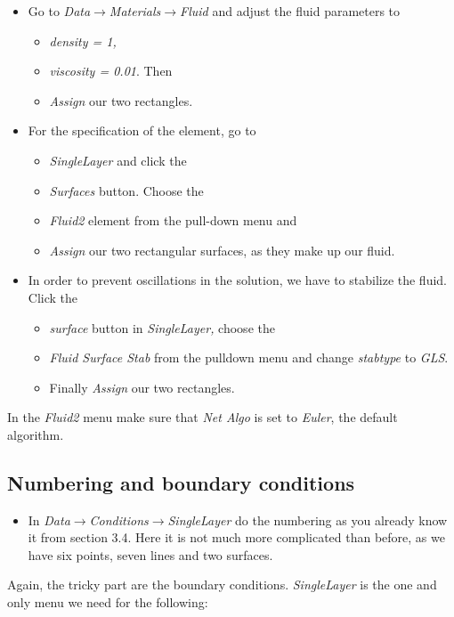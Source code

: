 \begin{itemize}
\item Go to \emph{Data$\to$Materials$\to$Fluid} and adjust the fluid parameters
to 

\begin{itemize}
\item \emph{density = 1, }
\item \emph{viscosity = 0.01}. Then 
\item \emph{Assign} our two rectangles. 
\end{itemize}
\item For the specification of the element, go to 

\begin{itemize}
\item \emph{SingleLayer} and click the 
\item \emph{Surfaces} button. Choose the 
\item \emph{Fluid2} element from the pull-down menu and 
\item \emph{Assign} our two rectangular surfaces, as they make up our fluid.
\end{itemize}
\item In order to prevent oscillations in the solution, we have to stabilize
the fluid. Click the 

\begin{itemize}
\item \emph{surface} button in \emph{SingleLayer,} choose the 
\item \emph{Fluid Surface Stab} from the pulldown menu and change \emph{stabtype} to  \emph{GLS}.
\item Finally \emph{Assign} our two rectangles.
\end{itemize}
\end{itemize}
In the \emph{Fluid2} menu make sure that \emph{Net Algo} is set to
\emph{Euler}, the default algorithm. 


\subsection{Numbering and boundary conditions}

\begin{itemize}
\item In \emph{Data$\to$Conditions$\to$SingleLayer} do the numbering as
you already know it from section 3.4. Here it is not much more complicated
than before, as we have six points, seven lines and two surfaces.
\end{itemize}
Again, the tricky part are the boundary conditions. \emph{SingleLayer}
is the one and only menu we need for the following:

